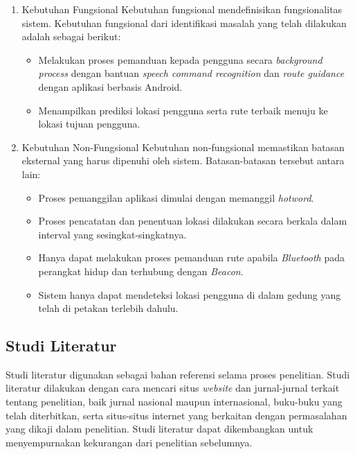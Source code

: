 \begin{enumerate}
\item Kebutuhan Fungsional
Kebutuhan fungsional mendefinisikan fungsionalitas sistem. Kebutuhan fungsional dari identifikasi masalah yang telah dilakukan adalah sebagai berikut:

\begin{itemize}
\item Melakukan proses pemanduan kepada pengguna secara \textit{background process} dengan bantuan \textit{speech command recognition} dan \textit{route guidance} dengan aplikasi berbasis Android.

\item Menampilkan prediksi lokasi pengguna serta rute terbaik menuju ke lokasi tujuan pengguna.

\end{itemize}

\item Kebutuhan Non-Fungsional
Kebutuhan non-fungsional memastikan batasan eksternal yang harus dipenuhi oleh sistem. Batasan-batasan tersebut antara lain:

\begin{itemize}
\item Proses pemanggilan aplikasi dimulai dengan memanggil \textit{hotword}.

\item Proses pencatatan dan penentuan lokasi dilakukan secara berkala dalam interval yang sesingkat-singkatnya.

\item Hanya dapat melakukan proses pemanduan rute apabila \textit{Bluetooth} pada perangkat hidup dan terhubung dengan \textit{Beacon}.

\item Sistem hanya dapat mendeteksi lokasi pengguna di dalam gedung yang telah di petakan terlebih dahulu.

\end{itemize}

\end{enumerate}

\subsection{Studi Literatur}
Studi literatur digunakan sebagai bahan referensi selama proses penelitian. Studi literatur dilakukan dengan cara mencari situs \textit{website} dan jurnal-jurnal terkait tentang penelitian, baik jurnal nasional maupun internasional, buku-buku yang telah diterbitkan, serta situs-situs internet yang berkaitan dengan permasalahan yang dikaji dalam penelitian. Studi literatur dapat dikembangkan untuk menyempurnakan kekurangan dari penelitian sebelumnya.

